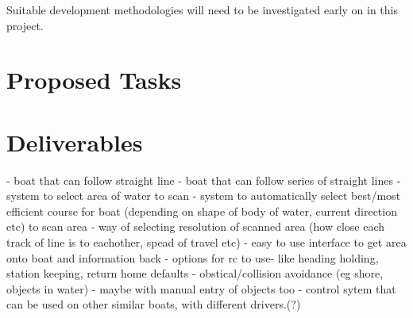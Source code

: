 \documentclass[titlepage 12pt]{article}
\begin{document}
{Suitable development methodologies will need to be investigated early on in this project.

\section{Proposed Tasks}


\section{Deliverables}  
- boat that can follow straight line
- boat that can follow series of straight lines
- system to select area of water to scan
- system to automatically select best/most efficient course for boat (depending on shape of body of water, current direction etc) to scan area
- way of selecting resolution of scanned area (how close each track of line is to eachother, spead of travel etc) 
- easy to use interface to get area onto boat and information back
- options for rc to use- like heading holding, station keeping, return home defaults
- obstical/collision avoidance (eg shore, objects in water)
    - maybe with manual entry of objects too
- control sytem that can be used on other similar boats, with different drivers.(?)

    
\newpage
\raggedright
{}

 

}
\end{document}
